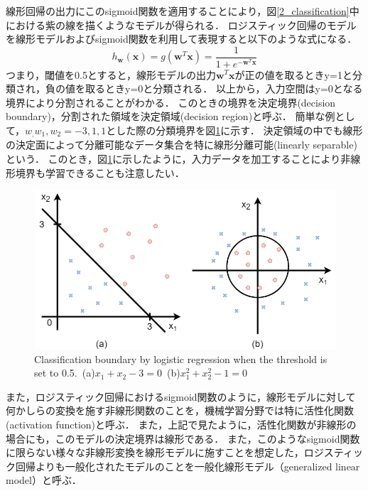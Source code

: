     線形回帰の出力にこのsigmoid関数を適用することにより，図\ref{2_classification}中における紫の線を描くようなモデルが得られる．
    ロジスティック回帰のモデルを線形モデルおよびsigmoid関数を利用して表現すると以下のような式になる．
    \begin{equation}
        h_{\bm{w}}(\bm{x}) = g\left(\bm{w}^T\bm{x}\right)=\frac{1}{1+e^{-\bm{w}^T\bm{x}}}
    \end{equation}
    つまり，閾値を0.5とすると，線形モデルの出力$\bm{w}^T\bm{x}$が正の値を取るときy=1と分類され，負の値を取るときy=0と分類される．
    以上から，入力空間はy=0となる境界により分割されることがわかる．
    このときの境界を決定境界(decision boundary)，分割された領域を決定領域(decision region)と呼ぶ．
    簡単な例として，${w_,w_1,w_2}={-3,1,1}$とした際の分類境界を図\ref{2_classification_example}に示す．
    決定領域の中でも線形の決定面によって分離可能なデータ集合を特に線形分離可能(linearly separable)という．
    このとき，図\ref{2_classification_example}に示したように，入力データを加工することにより非線形境界も学習できることも注意したい．
    \begin{figure}[ht]
        \begin{center}
            \includegraphics[width=12.0cm]{./8_appendix/img/classification_example}
            \caption{Classification boundary by logistic regression when the threshold is set to 0.5.\ (a)$x_1+x_2-3=0$\ (b)$x_1^2 + x_2^2-1=0$}
            \label{2_classification_example}
        \end{center}
    \end{figure}
    
    また，ロジスティック回帰におけるsigmoid関数のように，線形モデルに対して何かしらの変換を施す非線形関数のことを，機械学習分野では特に活性化関数(activation function)と呼ぶ．
    また，上記で見たように，活性化関数が非線形の場合にも，このモデルの決定境界は線形である．
    また，このようなsigmoid関数に限らない様々な非線形変換を線形モデルに施すことを想定した，ロジスティック回帰よりも一般化されたモデルのことを一般化線形モデル（generalized linear model\cite{mccullagh81nelder}）と呼ぶ．

